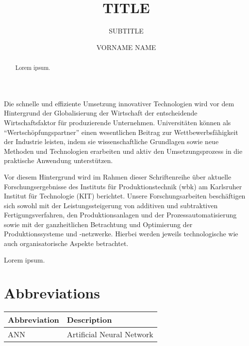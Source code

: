 \documentclass[oneside,dissertation]{wbk}
\author{VORNAME NAME}
\title{TITLE}
\subtitle{SUBTITLE}
\numberwithin{equation}{chapter}
\begin{document}

\maketitle

\begin{publisherpreface}
	Die schnelle und effiziente Umsetzung innovativer Technologien wird vor dem Hintergrund der Globalisierung der Wirtschaft der entscheidende Wirtschaftsfaktor f\"ur produzierende Unternehmen. Universit\"aten k\"onnen als ``Wertsch\"opfungspartner'' einen wesentlichen Beitrag zur Wettbewerbsf\"ahigkeit der Industrie leisten, indem sie wissenschaftliche Grundlagen sowie neue Methoden und Technologien erarbeiten und aktiv den Umsetzungsprozess in die praktische Anwendung unterst\"utzen.
	
	Vor diesem Hintergrund wird im Rahmen dieser Schriftenreihe \"uber aktuelle Forschungsergebnisse des Instituts f\"ur Produktionstechnik (wbk) am Karlsruher Institut f\"ur Technologie (KIT) berichtet. Unsere Forschungsarbeiten besch\"aftigen sich sowohl mit der Leistungssteigerung von additiven und subtraktiven Fertigungsverfahren, den Produktionsanlagen und der Prozessautomatisierung sowie mit der ganzheitlichen Betrachtung und Optimierung der Produktionssysteme und -netzwerke. Hierbei werden jeweils technologische wie auch organisatorische Aspekte betrachtet.
\end{publisherpreface}

\begin{authorpreface}
	Lorem ipsum.
\end{authorpreface}

\begin{abstract}
	Lorem ipsum.
\end{abstract}

\frontmatter

\renewcommand{\@pnumwidth}{2.5em}
\tableofcontents

\chapter{Abbreviations}

\begin{longtable}{p{3cm} p{13cm}}
	\textbf{Abbreviation} & \textbf{Description} \\ \midrule \endhead
	ANN & Artificial Neural Network \\
\end{longtable}
\end{document}
